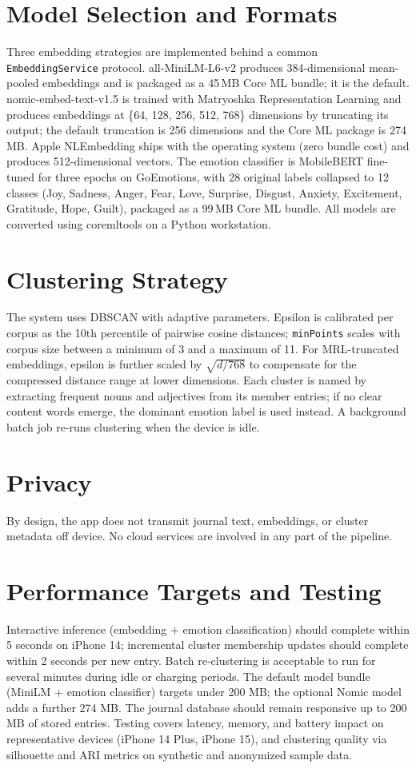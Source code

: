\section{Model Selection and Formats}
Three embedding strategies are implemented behind a common \\ \texttt{EmbeddingService} protocol. all-MiniLM-L6-v2 produces 384-dimensional mean-pooled embeddings and is packaged as a 45\,MB Core ML bundle; it is the default. nomic-embed-text-v1.5 is trained with Matryoshka Representation Learning and produces embeddings at \{64, 128, 256, 512, 768\} dimensions by truncating its output; the default truncation is 256 dimensions and the Core ML package is 274\,MB. Apple NLEmbedding ships with the operating system (zero bundle cost) and produces 512-dimensional vectors. The emotion classifier is MobileBERT fine-tuned for three epochs on GoEmotions, with 28 original labels collapsed to 12 classes (Joy, Sadness, Anger, Fear, Love, Surprise, Disgust, Anxiety, Excitement, Gratitude, Hope, Guilt), packaged as a 99\,MB Core ML bundle. All models are converted using coremltools on a Python workstation.

\section{Clustering Strategy}
The system uses DBSCAN with adaptive parameters. Epsilon is calibrated per corpus as the 10th percentile of pairwise cosine distances; \texttt{minPoints} scales with corpus size between a minimum of 3 and a maximum of 11. For MRL-truncated embeddings, epsilon is further scaled by $\sqrt{d/768}$ to compensate for the compressed distance range at lower dimensions. Each cluster is named by extracting frequent nouns and adjectives from its member entries; if no clear content words emerge, the dominant emotion label is used instead. A background batch job re-runs clustering when the device is idle.

\section{Privacy}
By design, the app does not transmit journal text, embeddings, or cluster metadata off device. No cloud services are involved in any part of the pipeline.

\section{Performance Targets and Testing}
Interactive inference (embedding + emotion classification) should complete within 5 seconds on iPhone 14; incremental cluster membership updates should complete within 2 seconds per new entry. Batch re‑clustering is acceptable to run for several minutes during idle or charging periods. The default model bundle (MiniLM + emotion classifier) targets under 200 MB; the optional Nomic model adds a further 274 MB. The journal database should remain responsive up to 200 MB of stored entries. Testing covers latency, memory, and battery impact on representative devices (iPhone 14 Plus, iPhone 15), and clustering quality via silhouette and ARI metrics on synthetic and anonymized sample data.

